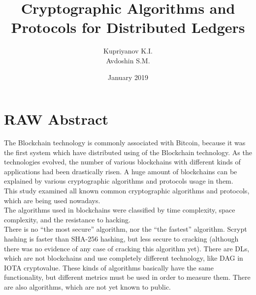 \documentclass[12pt]{article}
\title{Cryptographic Algorithms and Protocols for Distributed Ledgers}
\author{Kupriyanov K.I.\\Avdoshin S.M.}
\date{January 2019}
\begin{document}
\maketitle

\section*{RAW Abstract}
The Blockchain technology is commonly associated with Bitcoin, because it was the
first system which have distributed using of the Blockchain technology. As the technologies evolved,
the number of various blockchains with different kinds of applications had been 
drastically risen. A huge amount of blockchains can be explained by various cryptographic algorithms and protocols usage in them.\\
This study examined all known common cryptographic algorithms and
protocols, which are being used nowadays.\\
The algorithms used in blockchains were classified by time complexity, space
complexity, and the resistance to hacking.\\
There is no ``the most secure'' algorithm, nor the ``the fastest'' algorithm.
Scrypt hashing is faster than SHA-256 hashing, but less secure to cracking
(although there was no evidence of any case of cracking this algorithm yet).
There are DLs, which are not blockchains and use completely different
technology, like DAG in IOTA cryptovalue. These kinds of algorithms basically
have the same functionality, but different metrics must be used in order to
measure them. There are also algorithms, which are not yet known to public.\\
\end{document}
